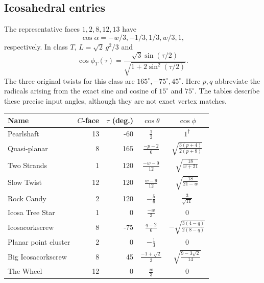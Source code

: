 \documentclass[11pt]{article}
\theoremstyle{definition}
\newcommand{\degc}{^{\circ}}
\begin{document}
\subsection{Icosahedral entries}\label{sec:icotables}
The representative faces $1,2,8,12,13$ have
\[
 \cos\alpha=-w/3,-1/3,1/3,w/3,1,
\]
respectively. In class $T$, $L=\sqrt2\,g^2/3$ and
\begin{equation}\label{eq:icophiT}
 \cos\phi_T(\tau)=
 \frac{\sqrt3\sin(\tau/2)}{\sqrt{1+2\sin^2(\tau/2)}}.
\end{equation}
The three original twists for this class are $165\degc,-75\degc,45\degc$.
Here $p,q$ abbreviate the radicals arising from the exact sine and cosine
of $15\degc$ and $75\degc$. The tables describe these precise input angles,
although they are not exact vertex matches.
\begin{center}
\small
\renewcommand{\arraystretch}{1.55}
\begin{tabular}{@{}lrrcc@{}}
\toprule
Name & $C$-face & $\tau$ (deg.) & $\cos\theta$ & $\cos\phi$\\
\midrule
Pearlshaft & 13 & -60 & $\displaystyle \frac{1}{2}$ & $\displaystyle 1^{\dagger}$\\
Quasi-planar & 8 & 165 & $\displaystyle \frac{- p - 2}{6}$ & $\displaystyle \sqrt{\frac{3 \left(p + 4\right)}{2 \left(p + 8\right)}}$\\
Two Strands & 1 & 120 & $\displaystyle \frac{- w - 9}{12}$ & $\displaystyle \sqrt{\frac{18}{w + 21}}$\\
Slow Twist & 12 & 120 & $\displaystyle \frac{w - 9}{12}$ & $\displaystyle \sqrt{\frac{18}{21 - w}}$\\
Rock Candy & 2 & 120 & $\displaystyle - \frac{5}{6}$ & $\displaystyle \frac{3}{\sqrt{11}}$\\
Icosa Tree Star & 1 & 0 & $\displaystyle \frac{- w}{3}$ & $\displaystyle 0$\\
Icosacorkscrew & 8 & -75 & $\displaystyle \frac{q - 2}{6}$ & $\displaystyle - \sqrt{\frac{3 \left(4 - q\right)}{2 \left(8 - q\right)}}$\\
Planar point cluster & 2 & 0 & $\displaystyle - \frac{1}{3}$ & $\displaystyle 0$\\
Big Icosacorkscrew & 8 & 45 & $\displaystyle \frac{-1 + \sqrt{2}}{3}$ & $\displaystyle \sqrt{\frac{9 - 3 \sqrt{2}}{14}}$\\
The Wheel & 12 & 0 & $\displaystyle \frac{w}{3}$ & $\displaystyle 0$\\
\bottomrule
\end{tabular}
\end{center}
\end{document}
